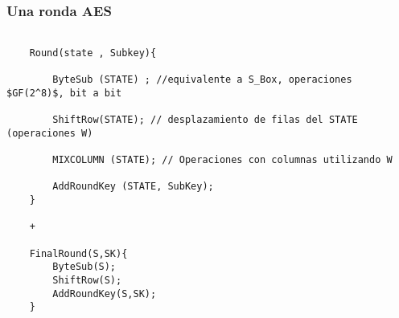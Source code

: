 \subsubsection{Una ronda AES}
\lstset{language=C, breaklines=true, basicstyle=\footnotesize}
\begin{lstlisting}[frame=single]

	Round(state , Subkey){
	
		ByteSub (STATE) ; //equivalente a S_Box, operaciones $GF(2^8)$, bit a bit
	
		ShiftRow(STATE); // desplazamiento de filas del STATE (operaciones W)
	
		MIXCOLUMN (STATE); // Operaciones con columnas utilizando W
	
		AddRoundKey (STATE, SubKey);
	} 
	
	+
	 
	FinalRound(S,SK){
		ByteSub(S);
		ShiftRow(S);
		AddRoundKey(S,SK);
	}
		
\end{lstlisting}

